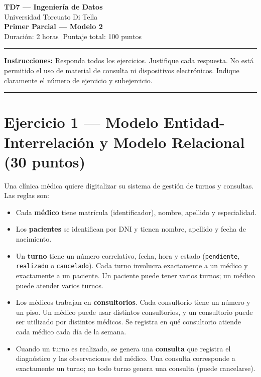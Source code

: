 \documentclass[11pt,a4paper]{article}
\begin{document}
\begin{center}
  {\LARGE\bfseries TD7 — Ingeniería de Datos}\\[6pt]
  {\large Universidad Torcuato Di Tella}\\[4pt]
  {\Large\bfseries Primer Parcial — Modelo 2}\\[4pt]
  {\normalsize Duración: 2 horas \quad|\quad Puntaje total: 100 puntos}
\end{center}
\noindent\rule{\linewidth}{0.8pt}
\vspace{2pt}

\noindent\textbf{Instrucciones:} Responda todos los ejercicios. Justifique cada respuesta. No está permitido el uso de material de consulta ni dispositivos electrónicos. Indique claramente el número de ejercicio y subejercicio.

\vspace{6pt}
\noindent\rule{\linewidth}{0.4pt}

\section*{Ejercicio 1 — Modelo Entidad-Interrelación y Modelo Relacional \hfill\normalfont(30 puntos)}

Una clínica médica quiere digitalizar su sistema de gestión de turnos y consultas. Las reglas son:

\begin{itemize}
  \item Cada \textbf{médico} tiene matrícula (identificador), nombre, apellido y especialidad.
  \item Los \textbf{pacientes} se identifican por DNI y tienen nombre, apellido y fecha de nacimiento.
  \item Un \textbf{turno} tiene un número correlativo, fecha, hora y estado (\texttt{pendiente}, \texttt{realizado} o \texttt{cancelado}). Cada turno involucra exactamente a un médico y exactamente a un paciente. Un paciente puede tener varios turnos; un médico puede atender varios turnos.
  \item Los médicos trabajan en \textbf{consultorios}. Cada consultorio tiene un número y un piso. Un médico puede usar distintos consultorios, y un consultorio puede ser utilizado por distintos médicos. Se registra en qué consultorio atiende cada médico cada día de la semana.
  \item Cuando un turno es realizado, se genera una \textbf{consulta} que registra el diagnóstico y las observaciones del médico. Una consulta corresponde a exactamente un turno; no todo turno genera una consulta (puede cancelarse).
\end{itemize}
\end{document}
